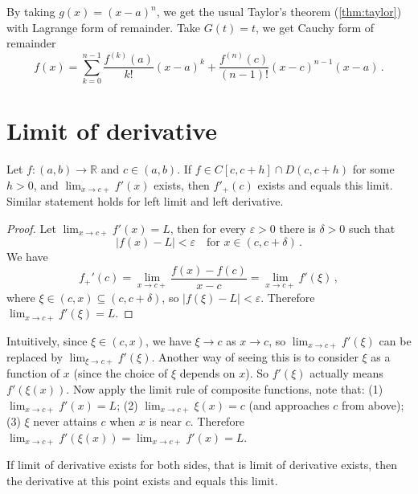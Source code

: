 \documentclass{article}
\newcommand{\R}{\mathbb R}
\begin{document}
By taking $ g(x) = (x - a)^n $, we get the usual Taylor's theorem (\ref{thm:taylor}) with Lagrange form of remainder. Take $ G(t) = t $, we get Cauchy form of remainder 
\[ 
    f(x) = \sum_{k = 0}^{n-1} \dfrac{f^{(k)} (a)}{k!} (x - a)^k + \dfrac{f^{(n)}(c)}{(n-1)!} (x - c)^{n - 1} (x - a) \,.
\]

\section{Limit of derivative}
\begin{theorem}
    Let $ f \colon (a, b) \to \R $ and $ c \in (a, b) $. If $ f \in C[c, c + h] \cap D(c, c + h) $ for some $ h > 0 $, and $ \lim_{x \to c+} f'(x) $ exists, then $ f'_+(c) $ exists and equals this limit. Similar statement holds for left limit and left derivative.
\end{theorem}

\begin{proof}
    Let $ \lim_{x \to c+} f'(x) = L $, then for every $ \varepsilon > 0 $ there is $ \delta > 0 $ such that
    \[ 
        |f(x) - L| < \varepsilon \quad \text{for } x \in (c, c + \delta) \,.
    \]
    We have
    \[ 
        f_+'(c) = \lim_{x \to c+} \dfrac{f(x) - f(c)}{x - c} = \lim_{x \to c+} f'(\xi) \,,
    \]
    where $ \xi \in (c, x) \subseteq (c, c + \delta) $, so $ |f(\xi) - L| < \varepsilon $. Therefore $ \lim_{x \to c+} f'(\xi) = L $.
\end{proof}

Intuitively, since $ \xi \in (c, x) $, we have $ \xi \to c $ as $ x \to c $, so $ \lim_{x \to c+} f'(\xi) $ can be replaced by $ \lim_{\xi \to c+} f'(\xi) $. Another way of seeing this is to consider $ \xi $ as a function of $ x $ (since the choice of $ \xi $ depends on $ x $). So $ f'(\xi) $ actually means $ f'(\xi(x)) $. Now apply the limit rule of composite functions, note that: (1) $ \lim_{x \to c+} f'(x) = L $; (2) $ \lim_{x \to c+} \xi(x) = c $ (and approaches $ c $ from above); (3) $ \xi $ never attains $ c $ when $ x $ is near $ c $. Therefore $ \lim_{x \to c+} f'(\xi(x)) = \lim_{x \to c+} f'(x) = L $.

If limit of derivative exists for both sides, that is limit of derivative exists, then the derivative at this point exists and equals this limit.
\end{document}
